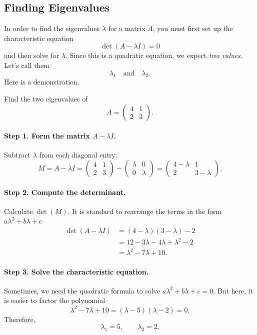 \documentclass[10pt,letterpaper]{article}
\begin{document}
\subsection{Finding Eigenvalues}
In order to find the eigenvalues $\lambda$ for a matrix $A$, you must first set up the characteristic equation
$$
\det(A-\lambda I)=0
$$
and then solve for $\lambda$. Since this is a quadratic equation, we expect \textit{two values}. Let's call them
$$
\lambda_1  \quad \text{and} \quad \lambda_2.
$$
Here is a demonstration.

\begin{example}[1]{
Find the two eigenvalues of
\[
A=
\begin{pmatrix}
4&1\\
2&3
\end{pmatrix}.
\]
}

\paragraph{Step 1. Form the matrix $A-\lambda I$.}
Subtract $\lambda$ from each diagonal entry:
\[
M=A-\lambda I
=
\begin{pmatrix}
4&1\\2&3
\end{pmatrix}
-
\begin{pmatrix}
\lambda&0\\0&\lambda
\end{pmatrix}
=
\begin{pmatrix}
4-\lambda&1\\
2&3-\lambda
\end{pmatrix}.
\]

\paragraph{Step 2. Compute the determinant.} Calculate $\det(M)$. It is standard to rearrange the terms in the form $a\lambda^2 + b\lambda + c$
\begin{align*}
\det(A-\lambda I)
&=(4-\lambda)(3-\lambda)-2\\
&=12-3\lambda -4\lambda +\lambda^2-2\\
&=\lambda^2-7\lambda+10.
\end{align*}

\paragraph{Step 3. Solve the characteristic equation.} Sometimes, we need the quadratic formula to solve $a\lambda^2 + b\lambda + c=0$. But here, it is easier to factor the polynomial
\[
\lambda^2-7\lambda+10
=(\lambda-5)(\lambda-2)=0.
\]
Therefore,
\[
\boxed{\lambda_1=5,\qquad \lambda_2=2.}
\]
\end{example}
\end{document}

